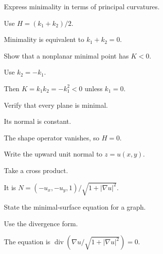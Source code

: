 \begin{exercise}\label{exr:vii19-02}
Express minimality in terms of principal curvatures.
\end{exercise}
\begin{hint}
Use \(H=(k_1+k_2)/2\).
\end{hint}
\begin{solution}
Minimality is equivalent to \(k_1+k_2=0\).
\end{solution}

\begin{exercise}\label{exr:vii19-03}
Show that a nonplanar minimal point has \(K<0\).
\end{exercise}
\begin{hint}
Use \(k_2=-k_1\).
\end{hint}
\begin{solution}
Then \(K=k_1k_2=-k_1^2<0\) unless \(k_1=0\).
\end{solution}

\begin{exercise}\label{exr:vii19-04}
Verify that every plane is minimal.
\end{exercise}
\begin{hint}
Its normal is constant.
\end{hint}
\begin{solution}
The shape operator vanishes, so \(H=0\).
\end{solution}

\begin{exercise}\label{exr:vii19-05}
Write the upward unit normal to \(z=u(x,y)\).
\end{exercise}
\begin{hint}
Take a cross product.
\end{hint}
\begin{solution}
It is \(N=(-u_x,-u_y,1)/\sqrt{1+|\nabla u|^2}\).
\end{solution}

\begin{exercise}\label{exr:vii19-06}
State the minimal-surface equation for a graph.
\end{exercise}
\begin{hint}
Use the divergence form.
\end{hint}
\begin{solution}
The equation is \(\operatorname{div}(\nabla u/\sqrt{1+|\nabla u|^2})=0\).
\end{solution}

